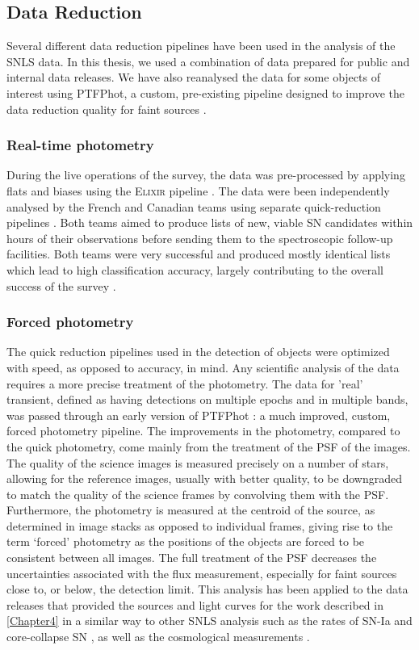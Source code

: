 \subsection{Data Reduction}
Several different data reduction pipelines have been used in the analysis of the SNLS data. In this thesis, we used a combination of data prepared for public and internal data releases. We have also reanalysed the data for some objects of interest using PTFPhot, a custom, pre-existing pipeline designed to improve the data reduction quality for faint sources \citep{Firth2015}.

\subsubsection{Real-time photometry}
During the live operations of the survey, the data was pre-processed by applying flats and biases using the \textsc{Elixir} pipeline \citep{Magnier2004}. The data were been independently analysed by the French and Canadian teams using separate quick-reduction pipelines \citep{Astier2006,Bazin2011}. Both teams aimed to produce lists of new, viable SN candidates within hours of their observations before sending them to the spectroscopic follow-up facilities. Both teams were very successful and produced mostly identical lists which lead to high classification accuracy, largely contributing to the overall success of the survey \citep{Pritchet2004}.

\subsubsection{Forced photometry}
The quick reduction pipelines used in the detection of objects were optimized with speed, as opposed to accuracy, in mind. Any scientific analysis of the data requires a more precise treatment of the photometry. The data for 'real' transient, defined as having detections on multiple epochs and in multiple bands, was passed through an early version of PTFPhot \citep{Firth2015}: a much improved, custom, forced photometry pipeline. The improvements in the photometry, compared to the quick photometry, come mainly from the treatment of the PSF of the images. The quality of the science images is measured precisely on a number of stars, allowing for the reference images, usually with better quality, to be downgraded to match the quality of the science frames by convolving them with the PSF. Furthermore, the photometry is measured at the centroid of the source, as determined in image stacks as opposed to individual frames, giving rise to the term `forced' photometry as the positions of the objects are forced to be consistent between all images. The full treatment of the PSF decreases the uncertainties associated with the flux measurement, especially for faint sources close to, or below, the detection limit. This analysis has been applied to the data releases that provided the sources and light curves for the work described in \cref{Chapter4} in a similar way to other SNLS analysis such as the rates of SN-Ia \citep{Perrett2012} and core-collapse SN \citep{Bazin2009}, as well as the cosmological measurements \citep{Astier2006,Sullivan2011}.

